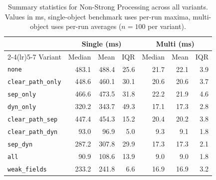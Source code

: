 \begin{table}[t]
\centering
\caption{Summary statistics for Non-Strong Processing across all variants. Values in ms, single-object benchmark uses per-run maxima, multi-object uses per-run averages ($n=100$ per variant).}
\label{tab:stats-nonstrong}
\begin{tabular}{l rrr rrr}
\toprule
 & \multicolumn{3}{c}{Single (ms)} & \multicolumn{3}{c}{Multi (ms)} \\
\cmidrule(lr){2-4}\cmidrule(lr){5-7}
Variant & Median & Mean & IQR & Median & Mean & IQR \\
\midrule
\texttt{none} & 483.1 & 488.4 & 25.6 & 21.7 & 22.1 & 3.9 \\
\texttt{clear\_path\_only} & 448.6 & 460.1 & 30.1 & 20.6 & 20.6 & 3.7 \\
\texttt{sep\_only} & 466.6 & 473.5 & 31.8 & 22.2 & 21.9 & 4.6 \\
\texttt{dyn\_only} & 320.2 & 343.7 & 49.3 & 17.1 & 17.3 & 2.8 \\
\texttt{clear\_path\_sep} & 447.4 & 454.3 & 15.2 & 20.4 & 20.2 & 3.8 \\
\texttt{clear\_path\_dyn} & 93.0 & 96.9 & 5.0 & 9.3 & 9.1 & 1.8 \\
\texttt{sep\_dyn} & 287.2 & 307.8 & 29.9 & 17.3 & 17.3 & 2.1 \\
\texttt{all} & 90.9 & 108.6 & 13.9 & 9.0 & 9.0 & 1.8 \\
\texttt{weak\_fields} & 233.2 & 241.8 & 6.6 & 16.9 & 16.9 & 3.2 \\
\bottomrule
\end{tabular}
\end{table}
